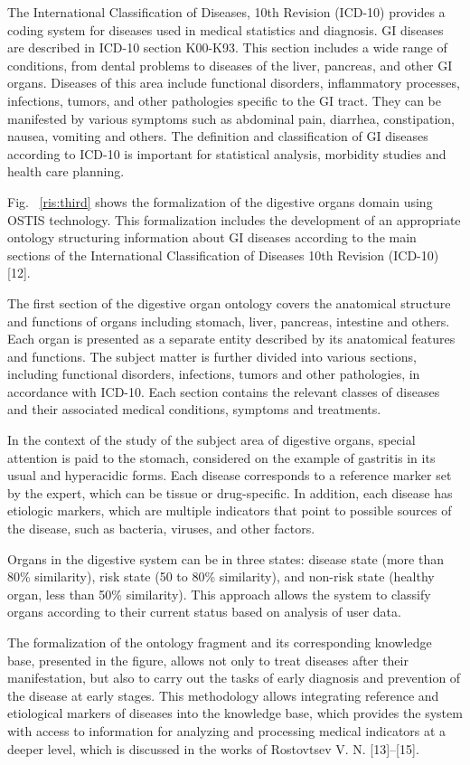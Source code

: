 \documentclass[10pt, a4paper]{article}
\begin{document}
\begin{multicols}{2}
\setlength{\parindent}{0.8cm}
\par
\setlength{\parindent}{0.3cm}
\fontsize{10}{15.93}\selectfont
The International Classification of Diseases, 10th Revision (ICD-10) provides a coding system for diseases
used in medical statistics and diagnosis. GI diseases
are described in ICD-10 section K00-K93. This section includes a wide range of conditions, from dental
problems to diseases of the liver, pancreas, and other
GI organs. Diseases of this area include functional disorders, inflammatory processes, infections, tumors, and
other pathologies specific to the GI tract. They can be
manifested by various symptoms such as abdominal pain,
diarrhea, constipation, nausea, vomiting and others. The
definition and classification of GI diseases according to
ICD-10 is important for statistical analysis, morbidity
studies and health care planning.
\par 
Fig. ~\ref{ris:third} shows the formalization of the digestive organs domain using OSTIS technology. This formalization
includes the development of an appropriate ontology
structuring information about GI diseases according to
the main sections of the International Classification of
Diseases 10th Revision (ICD-10) [12].
\par
The first section of the digestive organ ontology covers
the anatomical structure and functions of organs including stomach, liver, pancreas, intestine and others. Each
organ is presented as a separate entity described by its
anatomical features and functions. The subject matter is
further divided into various sections, including functional
disorders, infections, tumors and other pathologies, in
accordance with ICD-10. Each section contains the relevant classes of diseases and their associated medical
conditions, symptoms and treatments.
\par
In the context of the study of the subject area of
digestive organs, special attention is paid to the stomach, considered on the example of gastritis in its usual
and hyperacidic forms. Each disease corresponds to a
reference marker set by the expert, which can be tissue
or drug-specific. In addition, each disease has etiologic
markers, which are multiple indicators that point to
possible sources of the disease, such as bacteria, viruses,
and other factors.
\par
Organs in the digestive system can be in three states:
disease state (more than 80\% similarity), risk state (50%
to 80\% similarity), and non-risk state (healthy organ, less
than 50\% similarity). This approach allows the system to
classify organs according to their current status based on
analysis of user data.
\par
The formalization of the ontology fragment and its
corresponding knowledge base, presented in the figure,
allows not only to treat diseases after their manifestation,
but also to carry out the tasks of early diagnosis and
prevention of the disease at early stages. This methodology allows integrating reference and etiological markers
of diseases into the knowledge base, which provides
the system with access to information for analyzing and
processing medical indicators at a deeper level, which is
discussed in the works of Rostovtsev V. N. [13]–[15].


\end{multicols}
\end{document}
